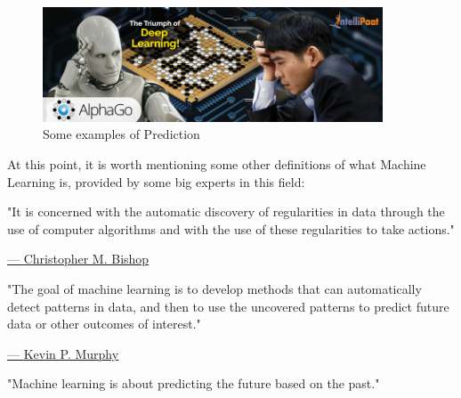 \begin{itemize}
          \vspace{5mm}

          \begin{figure}[h]
              \centering
              \includegraphics[width=0.9\textwidth]{../img/AlphaGo}
              \caption{Some examples of Prediction}
          \end{figure}

          \vspace{5mm}
\end{itemize}

At this point, it is worth mentioning some other definitions of what
Machine Learning is, provided by some big experts in this field:

\vspace{5mm}

\begin{quoting}
    "It is concerned with the automatic discovery of regularities in
    data through the use of computer algorithms and with the use of
    these regularities to take actions."
\end{quoting}

\hspace{284pt}
\href{https://en.wikipedia.org/wiki/Christopher_Bishop}{--- \underline{Christopher M. Bishop}}

\newpage

\begin{quoting}
    "The goal of machine learning is to develop methods that can
    automatically detect patterns in data, and then to use the uncovered
    patterns to predict future data or other outcomes of interest."
\end{quoting}

\hspace{312pt}
\href{https://www.cs.ubc.ca/~murphyk/}{--- \underline{Kevin P. Murphy}}

\vspace{5mm}

\begin{quoting}
    "Machine learning is about predicting the future based on the past."
\end{quoting}

